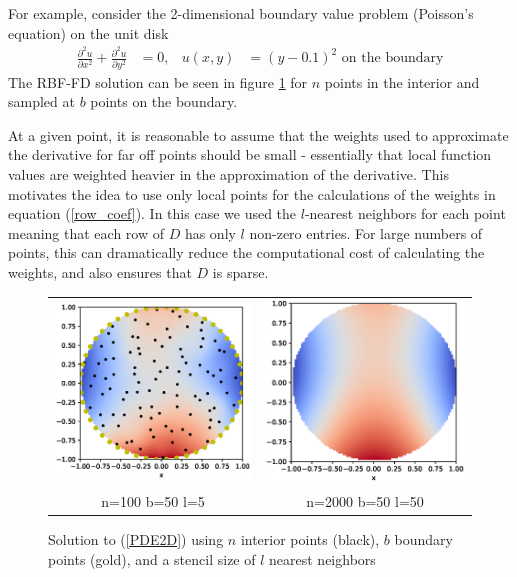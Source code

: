 \documentclass[12pt]{article}
\begin{document}
For example, consider the 2-dimensional boundary value problem (Poisson's equation) on the unit disk
\begin{align}
\frac{\partial ^2u}{\partial x^2} + \frac{\partial ^2u}{\partial y^2} &= 0, & u(x,y)&=(y-0.1)^2 \text{ on the boundary}  \label{PDE2D}
\end{align}
The RBF-FD solution can be seen in figure \ref{2Dsolutions} for $n$ points in the interior and sampled at $b$ points on the boundary.

At a given point, it is reasonable to assume that the weights used to approximate the derivative for far off points should be small - essentially that local function values are weighted heavier in the approximation of the derivative. This motivates the idea to use only local points for the calculations of the weights in equation (\ref{row_coef}). In this case we used the $l$-nearest neighbors for each point meaning that each row of $D$ has only $l$ non-zero entries. For large numbers of points, this can dramatically reduce the computational cost of calculating the weights, and also ensures that $D$ is sparse. 

\begin{figure}[p]
	\begin{tabular}{cc}
		\includegraphics[width=.5\textwidth]{2D_n100_b50} & \includegraphics[width=.5\textwidth]{2D_n2000_b50_l50} \\
		n=100 \phantom{==} b=50 \phantom{==} l=5 & n=2000 \phantom{==} b=50 \phantom{==} l=50 
	\end{tabular}
	\caption{Solution to (\ref{PDE2D}) using $n$ interior points (black), $b$ boundary points (gold), and a stencil size of $l$ nearest neighbors}
	\label{2Dsolutions}
	\centering
\end{figure}
\end{document}
